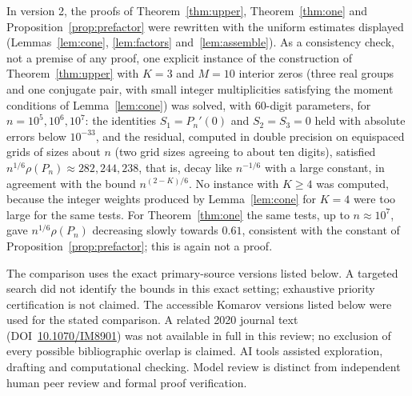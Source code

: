 \documentclass[11pt]{article}
\theoremstyle{remark}\newtheorem{remark}[theorem]{Remark}
\begin{document}
In version 2, the proofs of Theorem~\ref{thm:upper}, Theorem~\ref{thm:one}
and Proposition~\ref{prop:prefactor} were rewritten with the uniform
estimates displayed (Lemmas~\ref{lem:cone}, \ref{lem:factors} and~\ref{lem:assemble}). As a
consistency check, not a premise of any proof, one explicit instance of the
construction of Theorem~\ref{thm:upper} with \(K=3\) and
\(M=10\) interior zeros (three real groups and one conjugate pair, with small
integer multiplicities satisfying the moment conditions of
Lemma~\ref{lem:cone}) was solved, with 60-digit parameters, for
\(n=10^5,10^6,10^7\): the identities \(S_1=P_n'(0)\) and
\(S_2=S_3=0\) held with absolute errors below \(10^{-33}\), and the residual, computed in double
precision on equispaced grids of sizes about \(n\) (two grid sizes agreeing to
about ten digits), satisfied \(n^{1/6}\rho(P_n)\approx282,244,238\), that is,
decay like \(n^{-1/6}\) with a large constant, in agreement
with the bound \(n^{(2-K)/6}\). No instance with
\(K\ge4\) was computed, because the integer weights produced by
Lemma~\ref{lem:cone} for \(K=4\) were too large for the same tests. For
Theorem~\ref{thm:one} the same tests, up to \(n\approx10^7\), gave
\(n^{1/6}\rho(P_n)\) decreasing slowly towards \(0.61\), consistent with the
constant of Proposition~\ref{prop:prefactor}; this is again not a proof.

The comparison uses the exact primary-source versions listed below.
A targeted search did not identify the bounds in this exact setting;
exhaustive priority certification is not claimed. The accessible
Komarov versions listed below were used for the stated comparison.
A related 2020 journal text (DOI~\href{https://doi.org/10.1070/IM8901}{10.1070/IM8901})
was not available in full in this review;
no exclusion of every possible bibliographic overlap is claimed.
AI tools assisted exploration, drafting and computational checking.
Model review is distinct from independent human peer review and
formal proof verification.
\end{document}
